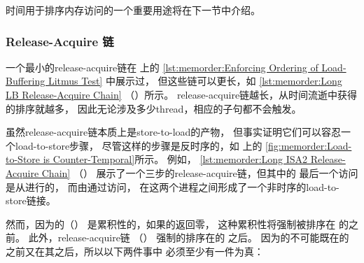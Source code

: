 \QuickQuizEnd

时间用于排序内存访问的一个重要用途将在下一节中介绍。

\subsubsection{Release-Acquire 链}
\label{sec:memorder:Release-Acquire Chains}

一个最小的release-acquire链在
上的
\cref{lst:memorder:Enforcing Ordering of Load-Buffering Litmus Test}
中展示过，
但这些链可以更长，如
\cref{lst:memorder:Long LB Release-Acquire Chain}
（）所示。
release-acquire链越长，从时间流逝中获得的排序就越多，
因此无论涉及多少thread，相应的子句都不会触发。

\begin{listing}

\caption{长LB Release-Acquire链}
\label{lst:memorder:Long LB Release-Acquire Chain}
\end{listing}

虽然release-acquire链本质上是store-to-load的产物，
但事实证明它们可以容忍一个load-to-store步骤，
尽管这样的步骤是反时序的，如
上的
\cref{fig:memorder:Load-to-Store is Counter-Temporal}所示。
例如，
\cref{lst:memorder:Long ISA2 Release-Acquire Chain}
（）
展示了一个三步的release-acquire链，但其中的
最后一个访问是从进行的，
而由通过访问，
在这两个进程之间形成了一个非时序的load-to-store链接。
\begin{fcvref}
然而，因为的（）
是累积性的，如果的返回零，
这种累积性将强制被排序在
的之前。
此外，release-acquire链
（）
强制的排序在的
之后。
因为的不可能既在的
之前又在其之后，所以以下两件事中
必须至少有一件为真：
\end{fcvref}

